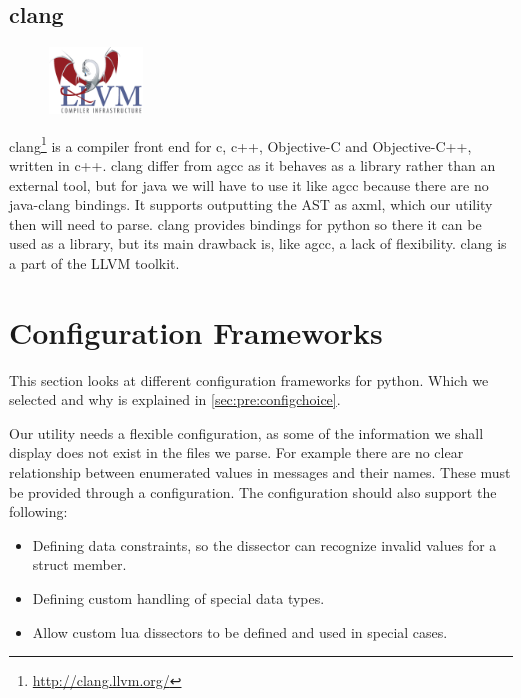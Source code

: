 \subsection{\Gls{clang}}
\label{sec:pre:clang}
\begin{figure}
	\vspace{-20pt}
	\includegraphics[width=2.5cm]{./planning/img/llvm_logo}
	\vspace{-20pt}
\end{figure}
\Gls{clang}\footnote{\url{http://clang.llvm.org/}} is a compiler front end for \Gls{c}, 
\Gls{c++}, \Gls{Objective-C} and \Gls{Objective-C++}, written in \Gls{c++}. \Gls{clang} differ from \Gls{agcc} as it
behaves as a \gls{library} rather than an external tool, but for \Gls{java} we will have to
use it like \Gls{agcc} because there are no \Gls{java}-\Gls{clang} bindings. It supports
outputting the \gls{AST} as \Gls{axml}, which our \gls{utility} then will need to
parse. \Gls{clang} provides bindings for \Gls{python} so there it can be used as a \gls{library},
but its main drawback is, like \Gls{agcc}, a lack of flexibility. \Gls{clang} is a part of
the LLVM toolkit.


\section{Configuration Frameworks}
\label{sec:pre:config}
This section looks at different configuration frameworks for \Gls{python}. Which we
selected and why is explained in \autoref{sec:pre:configchoice}.

Our \gls{utility} needs a flexible configuration, as some of the information we
shall display does not exist in the files we parse. For example there are no
clear relationship between enumerated values in messages and their names.
These must be provided through a configuration. The configuration should also
support the following:
\begin{itemize}
	\item Defining data constraints, so the \gls{dissector} can recognize invalid
		values for a \gls{struct} member.
	\item Defining custom handling of special data types.
	\item Allow custom \Gls{lua} \glspl{dissector} to be defined and used in special cases.
\end{itemize}

